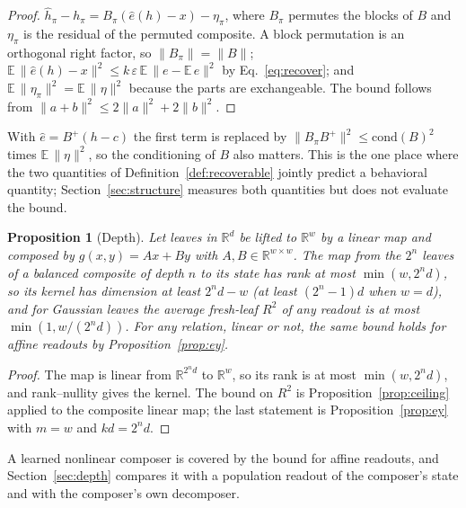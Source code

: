 \documentclass[10pt]{article}
\theoremstyle{plain}
\newtheorem{proposition}{Proposition}
\theoremstyle{remark}
\newcommand{\R}{\mathbb{R}}
\begin{document}
\begin{proof}
$\hat{h}_\pi - h_\pi = B_\pi(\hat{e}(h) - x) - \eta_\pi$, where $B_\pi$ permutes the blocks of $B$ and $\eta_\pi$ is the residual of the permuted composite. A block permutation is an orthogonal right factor, so $\lVert B_\pi \rVert = \lVert B \rVert$; $\mathbb{E}\,\lVert \hat{e}(h) - x \rVert^2 \le k\,\varepsilon\,\mathbb{E}\,\lVert e - \mathbb{E}\,e\rVert^2$ by Eq.~\eqref{eq:recover}; and $\mathbb{E}\,\lVert \eta_\pi \rVert^2 = \mathbb{E}\,\lVert \eta \rVert^2$ because the parts are exchangeable. The bound follows from $\lVert a + b \rVert^2 \le 2\lVert a \rVert^2 + 2\lVert b \rVert^2$.
\end{proof}

\noindent
With $\hat{e} = B^{+}(h - c)$ the first term is replaced by $\lVert B_\pi B^{+} \rVert^2 \le \mathrm{cond}(B)^2$ times $\mathbb{E}\,\lVert \eta \rVert^2$, so the conditioning of $B$ also matters. This is the one place where the two quantities of Definition~\ref{def:recoverable} jointly predict a behavioral quantity; Section~\ref{sec:structure} measures both quantities but does not evaluate the bound.

\begin{proposition}[Depth]
\label{prop:depth}
Let leaves in $\R^d$ be lifted to $\R^w$ by a linear map and composed by $g(x, y) = Ax + By$ with $A, B \in \R^{w \times w}$. The map from the $2^n$ leaves of a balanced composite of depth $n$ to its state has rank at most $\min(w, 2^n d)$, so its kernel has dimension at least $2^n d - w$ (at least $(2^n - 1)d$ when $w = d$), and for Gaussian leaves the average fresh-leaf $R^2$ of any readout is at most $\min(1, w/(2^n d))$. For any relation, linear or not, the same bound holds for affine readouts by Proposition~\ref{prop:ey}.
\end{proposition}

\begin{proof}
The map is linear from $\R^{2^n d}$ to $\R^w$, so its rank is at most $\min(w, 2^n d)$, and rank--nullity gives the kernel. The bound on $R^2$ is Proposition~\ref{prop:ceiling} applied to the composite linear map; the last statement is Proposition~\ref{prop:ey} with $m = w$ and $kd = 2^n d$.
\end{proof}

\noindent
A learned nonlinear composer is covered by the bound for affine readouts, and Section~\ref{sec:depth} compares it with a population readout of the composer's state and with the composer's own decomposer.
\end{document}
